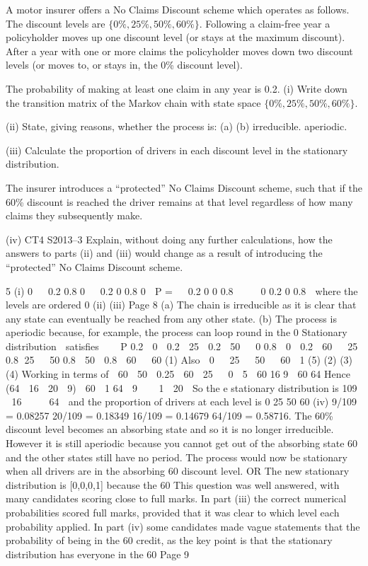 \documentclass[a4paper,12pt]{article}
\begin{document}
A motor insurer offers a No Claims Discount scheme which operates as follows. The discount levels are $\{0\%,25\%, 50\%, 60\%\}$. Following a claim-free year a
policyholder moves up one discount level (or stays at the maximum discount). After a year with one or more claims the policyholder moves down two discount levels (or
moves to, or stays in, the 0\% discount level).

The probability of making at least one claim in any year is 0.2.
(i) Write down the transition matrix of the Markov chain with state space $\{0\%,25\%, 50\%, 60\%\}$.

(ii) State, giving reasons, whether the process is:
(a)
(b)
irreducible.
aperiodic.

(iii)
Calculate the proportion of drivers in each discount level in the stationary distribution.

The insurer introduces a “protected” No Claims Discount scheme, such that if the 60\% discount is reached the driver remains at that level regardless of how many
claims they subsequently make.

(iv)
CT4 S2013–3
Explain, without doing any further calculations, how the answers to parts (ii)
and (iii) would change as a result of introducing the “protected” No Claims
Discount scheme.

5
(i)
0 
 0.2 0.8 0


0.2 0 0.8 0 
P = 
 0.2 0
0 0.8 


 0 0.2 0 0.8 
where the levels are ordered 0%
(ii)
(iii)
Page 8
(a) The chain is irreducible as it is clear that any state can eventually be reached
from any other state.
(b) The process is aperiodic because, for example, the process can loop round in
the 0%
Stationary distribution  satisfies    P
0.2  0  0.2  25  0.2  50   0
0.8  0  0.2  60   25
0.8 25   50
0.8  50  0.8  60   60 (1)
Also  0   25   50   60  1 (5)
(2)
(3)
(4)%
Working in terms of  60
 50  0.25  60
 25 
 0 
5
 60
16
9
 60
64
Hence
(64  16  20  9)
 60  1
64
 9 
 
1  20 
So the e stationary distribution is
109  16 
 
 64 
and the proportion of drivers at each level is
0%
25%
50%
60%
(iv)
9/109 = 0.08257
20/109 = 0.18349
16/109 = 0.14679
64/109 = 0.58716.
The 60\% discount level becomes an absorbing state and so it is no longer irreducible.
However it is still aperiodic because you cannot get out of the absorbing state 60%
and the other states still have no period.
The process would now be stationary when all drivers are in the absorbing 60%
discount level.
OR
The new stationary distribution is [0,0,0,1] because the 60%
This question was well answered, with many candidates scoring close to full marks. In part
(iii) the correct numerical probabilities scored full marks, provided that it was clear to which
level each probability applied. In part (iv) some candidates made vague statements that the
probability of being in the 60%
credit, as the key point is that the stationary distribution has everyone in the 60%
Page 9%
\end{document}
